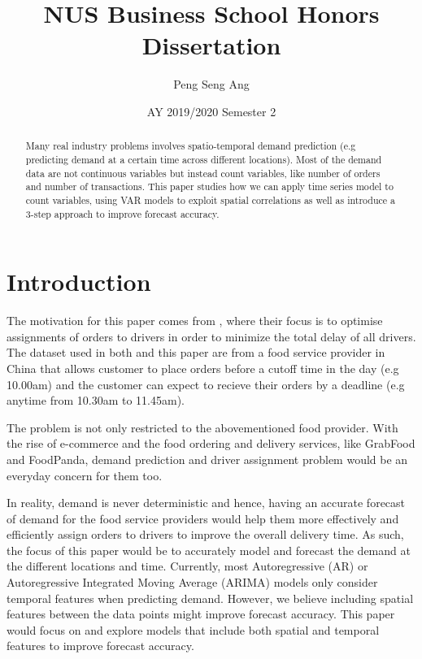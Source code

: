 \documentclass[12pt, letterpaper] {article}
\begin{document}
	\title{NUS Business School Honors Dissertation}
	\author{Peng Seng Ang}
	\date{AY 2019/2020 Semester 2}
	\maketitle
\begin{abstract}
\noindent Many real industry problems involves spatio-temporal demand prediction (e.g predicting demand at a certain time across different locations). Most of the demand data are not continuous variables but instead count variables, like number of orders and number of transactions. This paper studies how we can apply time series model to count variables, using VAR models to exploit spatial correlations as well as introduce a 3-step approach to improve forecast accuracy. 

\end{abstract}
\section{Introduction}

The motivation for this paper comes from \cite{Sheng2018}, where their focus is to optimise assignments of orders to drivers in order to minimize the total delay of all drivers. The dataset used in both \cite{Sheng2018} and this paper are from a food service provider in China that allows customer to place orders before a cutoff time in the day (e.g 10.00am) and the customer can expect to recieve their orders by a deadline (e.g anytime from 10.30am to 11.45am). 

\noindent The problem is not only restricted to the abovementioned food provider. With the rise of e-commerce and the food ordering and delivery services, like GrabFood and FoodPanda, demand prediction and driver assignment problem would be an everyday concern for them too. 

\noindent In reality, demand is never deterministic and hence, having an accurate forecast of demand for the food service providers would help them more effectively and efficiently assign orders to drivers to improve the overall delivery time. As such, the focus of this paper would be to accurately model and forecast the demand at the different locations and time. Currently, most Autoregressive (AR) or Autoregressive Integrated Moving Average (ARIMA) models only consider temporal features when predicting demand. However, we believe including spatial features between the data points might improve forecast accuracy. This paper would focus on and explore models that include both spatial and temporal features to improve forecast accuracy. 
\end{document}
